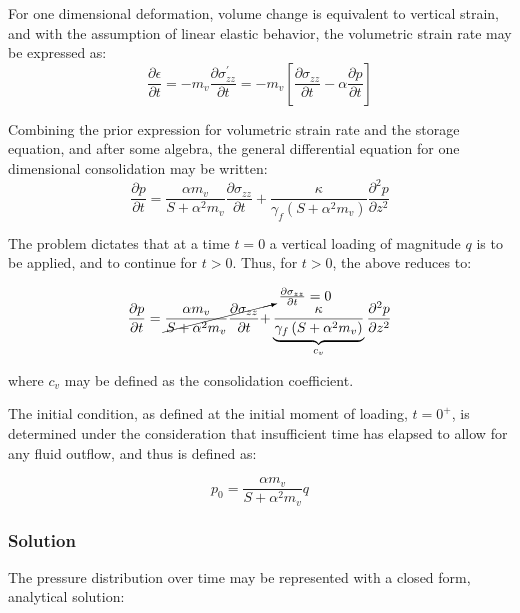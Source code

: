 For one dimensional deformation, volume change is equivalent to vertical strain, and with the assumption of linear elastic behavior, the volumetric strain rate may be expressed as:
\begin{equation}
 \frac{\partial \epsilon}{\partial t} = -m_{v} \frac{\partial \sigma^{'}_{zz}}{\partial t} = -m_{v} \left[ \frac{\partial \sigma_{zz}}{\partial t} - \alpha \frac{\partial p}{\partial t} \right]
\end{equation}

Combining the prior expression for volumetric strain rate and the storage equation, and after some algebra, the general differential equation for one dimensional consolidation may be written:
\begin{equation}
 \frac{\partial p}{\partial t} = \frac{\alpha m_{v}}{S + \alpha^{2} m_{v}} \frac{\partial \sigma_{zz}}{\partial t} + \frac{\kappa}{\gamma_{f}\left(S + \alpha^{2} m_{v} \right)} \frac{\partial^{2} p}{\partial z^{2}}
\end{equation}

The problem dictates that at a time $t = 0$ a vertical loading of magnitude $q$ is to be applied, and to continue for $t > 0$. Thus, for $t > 0$, the above reduces to:

\begin{equation}
\frac{\partial p}{\partial t} = \cancelto{\frac{\partial \sigma_{zz}}{\partial t} = 0}{\frac{\alpha m_{v}}{S + \alpha^{2} m_{v}} \frac{\partial \sigma_{zz}}{\partial t} +} \underbrace{\frac{\kappa}{\gamma_{f}\left(S + \alpha^{2} m_{v} \right)}}_{c_{v}} \frac{\partial^{2} p}{\partial z^{2}}
\end{equation}

where $c_{v}$ may be defined as the consolidation coefficient.\par

The initial condition, as defined at the initial moment of loading, $t = 0^{+}$, is determined under the consideration that insufficient time has elapsed to allow for any fluid outflow, and thus is defined as:

\begin{equation}
 p_{0} = \frac{\alpha m_{v}}{S + \alpha^{2} m_{v}} q
\end{equation}


\subsubsection{Solution}

The pressure distribution over time may be represented with a closed form, analytical
solution:

